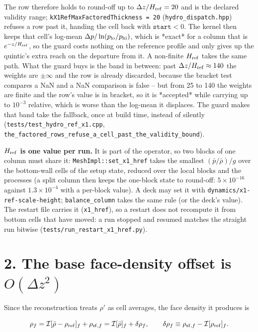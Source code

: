 \documentclass[11pt,a4paper]{article}
\begin{document}
The row therefore holds to round-off up to $\Delta z/H_{\rm ref} = 20$ and is the declared validity range;
\texttt{kX1RefMaxFactoredThickness = 20} (\texttt{hydro\_dispatch.hpp}) refuses a row past it, handing the cell back with
$\texttt{start} < 0$. The kernel then keeps that cell's log-mean $\Delta p/\ln(p_{\rm lo}/p_{\rm hi})$, which
is *exact* for a column that is $e^{-z/H_{\rm ref}}$, so the guard costs nothing on the reference profile and
only gives up the quintic's extra reach on the departure from it. A non-finite $H_{\rm ref}$ takes the same
path. What the guard buys is the band in between: past $\Delta z/H_{\rm ref} \approx 140$ the weights are
$\pm\infty$ and the row is already discarded, because the bracket test compares a NaN and a NaN comparison is
false -- but from 25 to 140 the weights are finite and the row's value is in bracket, so it is *accepted*
while carrying up to $10^{-3}$ relative, which is worse than the log-mean it displaces. The guard makes that
band take the fallback, once at build time, instead of silently (\texttt{tests/test\_hydro\_ref\_x1.cpp},
\texttt{the\_factored\_rows\_refuse\_a\_cell\_past\_the\_validity\_bound}).

\textbf{$H_{\rm ref}$ is one value per run.} It is part of the operator, so two blocks of one column must share it:
\texttt{MeshImpl::set\_x1\_href} takes the smallest $(\bar p/\bar\rho)/g$ over the bottom-wall cells of the setup
state, reduced over the local blocks and the processes (a split column then keeps the one-block state to
round-off: $5\times10^{-16}$ against $1.3\times10^{-4}$ with a per-block value). A deck may set it with
\texttt{dynamics/x1-ref-scale-height}; \texttt{balance\_column} takes the same rule (or the deck's value). The restart file
carries it (\texttt{x1\_href}), so a restart does not recompute it from bottom cells that have moved: a run stopped and
resumed matches the straight run bitwise (\texttt{tests/run\_restart\_x1\_href.py}).

\section*{2. The base face-density offset is $O(\Delta z^2)$}

Since the reconstruction treats $\rho'$ as cell averages, the face density it produces is

\begin{equation*}
\rho_f = \mathcal I[\bar\rho - \rho_{\rm ref}]_f + \rho_{{\rm sf},f} = \mathcal I[\bar\rho]_f + \delta\rho_f,
\qquad \delta\rho_f \equiv \rho_{{\rm sf},f} - \mathcal I[\rho_{\rm ref}]_f .
\end{equation*}
\end{document}
